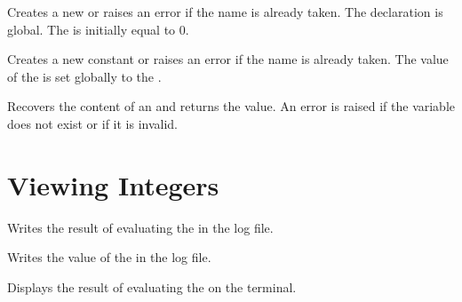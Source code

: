 \documentclass[oneside]{book}
\begin{document}
\begin{function}{\intNew}
\begin{syntax}
 
\end{syntax}
Creates a new  or raises an error if the name is
already taken. The declaration is global. The  is
initially equal to $0$.
\end{function}

\begin{function}{\intConst}
\begin{syntax}
  
\end{syntax}
Creates a new constant  or raises an error if the name
is already taken. The value of the  is set
globally to the .
\end{function}

\begin{function}{\intUse}
\begin{syntax}
 
\end{syntax}
Recovers the content of an  and returns the value.
An error is raised if the variable does not exist or if it is invalid.
\end{function}

\section{Viewing Integers}

\begin{function}{\intLog}
\begin{syntax}
 
\end{syntax}
Writes the result of evaluating the 
in the log file.
\end{function}

\begin{function}{\intVarLog}
\begin{syntax}
 
\end{syntax}
Writes the value of the  in the log file.
\end{function}

\begin{function}{\intShow}
\begin{syntax}
 
\end{syntax}
Displays the result of evaluating the 
on the terminal.
\end{function}
\end{document}
